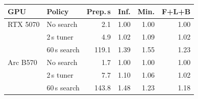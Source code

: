 \begin{tabular}{llrrrr}
\toprule
GPU & Policy & Prep.\,s & Inf. & Min. & F+L+B \\
\midrule
RTX 5070 & No search & 2.1 & 1.00 & 1.00 & 1.00 \\
 & 2\,s tuner & 4.9 & 1.02 & 1.09 & 1.02 \\
 & 60\,s search & 119.1 & 1.39 & 1.55 & 1.23 \\
Arc B570 & No search & 1.7 & 1.00 & 1.00 & 1.00 \\
 & 2\,s tuner & 7.7 & 1.10 & 1.06 & 1.02 \\
 & 60\,s search & 143.8 & 1.48 & 1.23 & 1.18 \\
\bottomrule
\end{tabular}
